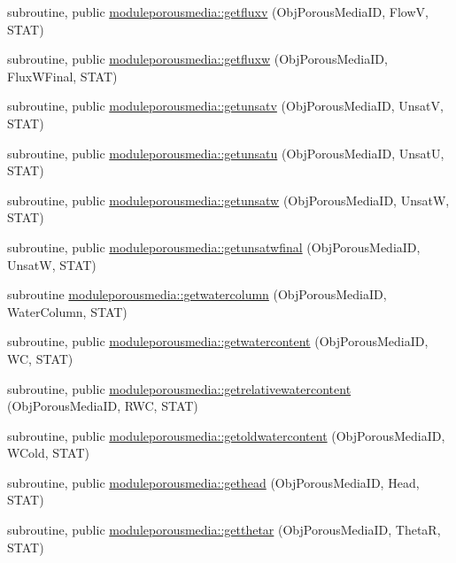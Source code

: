 \begin{DoxyCompactItemize}
\item 
subroutine, public \mbox{\hyperlink{namespacemoduleporousmedia_a7232e9ac88cf3c92c636f7432acbec07}{moduleporousmedia\+::getfluxv}} (Obj\+Porous\+Media\+ID, FlowV, S\+T\+AT)
\item 
subroutine, public \mbox{\hyperlink{namespacemoduleporousmedia_a5f6e92f6c7e21ae5b9a8b35203c299c7}{moduleporousmedia\+::getfluxw}} (Obj\+Porous\+Media\+ID, Flux\+W\+Final, S\+T\+AT)
\item 
subroutine, public \mbox{\hyperlink{namespacemoduleporousmedia_ae1e42504208d748be9b82e97810025bf}{moduleporousmedia\+::getunsatv}} (Obj\+Porous\+Media\+ID, UnsatV, S\+T\+AT)
\item 
subroutine, public \mbox{\hyperlink{namespacemoduleporousmedia_a4a8574c685ff8e68510803b38c3821ad}{moduleporousmedia\+::getunsatu}} (Obj\+Porous\+Media\+ID, UnsatU, S\+T\+AT)
\item 
subroutine, public \mbox{\hyperlink{namespacemoduleporousmedia_a34b7f3e33813dc9217457bf375eb5d30}{moduleporousmedia\+::getunsatw}} (Obj\+Porous\+Media\+ID, UnsatW, S\+T\+AT)
\item 
subroutine, public \mbox{\hyperlink{namespacemoduleporousmedia_a3fedd853f5701a32fbd7def6581fa30f}{moduleporousmedia\+::getunsatwfinal}} (Obj\+Porous\+Media\+ID, UnsatW, S\+T\+AT)
\item 
subroutine \mbox{\hyperlink{namespacemoduleporousmedia_a9423063423e189eb443c264d3302f41d}{moduleporousmedia\+::getwatercolumn}} (Obj\+Porous\+Media\+ID, Water\+Column, S\+T\+AT)
\item 
subroutine, public \mbox{\hyperlink{namespacemoduleporousmedia_a5b9d7f2adce9fea213bdc41bdb432a9f}{moduleporousmedia\+::getwatercontent}} (Obj\+Porous\+Media\+ID, WC, S\+T\+AT)
\item 
subroutine, public \mbox{\hyperlink{namespacemoduleporousmedia_a97c2a20bb7ae4ddffb2c0f4d7586412a}{moduleporousmedia\+::getrelativewatercontent}} (Obj\+Porous\+Media\+ID, R\+WC, S\+T\+AT)
\item 
subroutine, public \mbox{\hyperlink{namespacemoduleporousmedia_a2b7e324655161146b0aaf1af3e684670}{moduleporousmedia\+::getoldwatercontent}} (Obj\+Porous\+Media\+ID, W\+Cold, S\+T\+AT)
\item 
subroutine, public \mbox{\hyperlink{namespacemoduleporousmedia_a19324728630ae49f29d577f63d3f8523}{moduleporousmedia\+::gethead}} (Obj\+Porous\+Media\+ID, Head, S\+T\+AT)
\item 
subroutine, public \mbox{\hyperlink{namespacemoduleporousmedia_a40c5d4f62420edfa4bfd5f6ec20d6eda}{moduleporousmedia\+::getthetar}} (Obj\+Porous\+Media\+ID, ThetaR, S\+T\+AT)

\end{DoxyCompactItemize}
